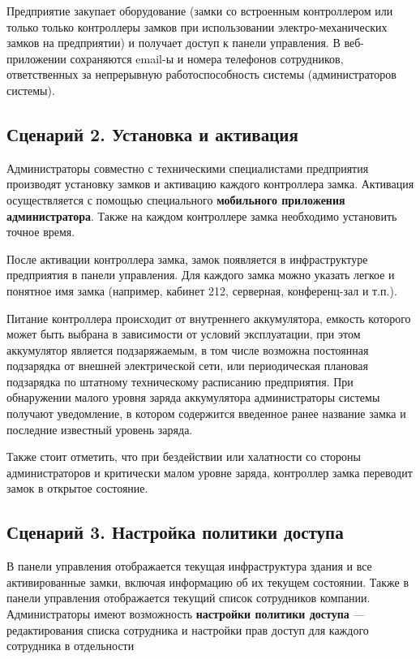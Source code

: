 Предприятие закупает оборудование (замки со встроенным контроллером или только только контроллеры замков при использовании электро-механических замков на предприятии) и получает доступ к панели управления. В веб-приложении сохраняются email-ы и номера телефонов сотрудников, ответственных за непрерывную работоспособность системы (администраторов системы).

\subsection{Сценарий 2. Установка и активация} \label{subsect2_3_2}

Администраторы совместно с техническими специалистами предприятия производят установку замков и активацию каждого контроллера замка. Активация осуществляется с помощью специального \textbf{мобильного приложения администратора}. Также на каждом контроллере замка необходимо установить точное время.

После активации контроллера замка, замок появляется в инфраструктуре предприятия в панели управления. Для каждого замка можно указать легкое и понятное имя замка (например, кабинет 212, серверная, конференц-зал и т.п.).

Питание контроллера происходит от внутреннего аккумулятора, емкость которого может быть выбрана в зависимости от условий эксплуатации, при этом аккумулятор является подзаряжаемым, в том числе возможна постоянная подзарядка от внешней электрической сети, или периодическая плановая подзарядка по штатному техническому расписанию предприятия. При обнаружении малого уровня заряда аккумулятора администраторы системы получают уведомление, в котором содержится введенное ранее название замка и последние известный уровень заряда.

Также стоит отметить, что при бездействии или халатности со стороны администраторов и критически малом уровне заряда, контроллер замка переводит замок в открытое состояние.

\subsection{Сценарий 3. Настройка политики доступа} \label{subsect2_3_3}

В панели управления отображается текущая инфраструктура здания и все активированные замки, включая информацию об их текущем состоянии. Также в панели управления отображается текущий список сотрудников компании. Администраторы имеют возможность \textbf{настройки политики доступа} — редактирования списка сотрудника и настройки прав доступ для каждого сотрудника в отдельности

